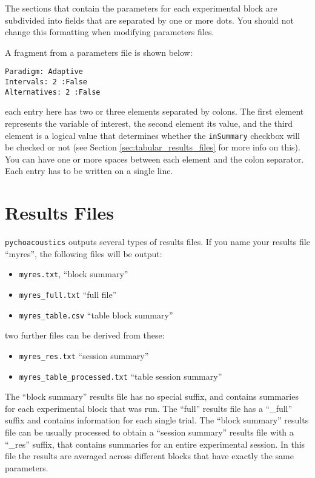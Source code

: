 The sections that contain the parameters for each experimental block are subdivided into fields that are separated by one or more dots. You should not change this formatting when modifying parameters files.

A fragment from a parameters file is shown below:
\begin{verbatim}
Paradigm: Adaptive
Intervals: 2 :False
Alternatives: 2 :False
\end{verbatim}
each entry here has two or three elements separated by colons. The first element represents the variable of interest, the second element its value, and the third element is a logical value that determines whether the \texttt{inSummary} checkbox will be checked or not (see Section \ref{sec:tabular_results_files} for more info on this). You can have one or more spaces between each element and the colon separator. Each entry has to be written on a single line.

\section{Results Files}
\label{sec:results_files}
\texttt{pychoacoustics} outputs several types of results files. If you name your results file ``myres'', the following files will be output:
\begin{itemize}
\item \verb+myres.txt+, ``block summary''
\item \verb+myres_full.txt+ ``full file''
\item \verb+myres_table.csv+ ``table block summary''
\end{itemize}
two further files can be derived from these:
\begin{itemize}
\item \verb+myres_res.txt+ ``session summary''
\item \verb+myres_table_processed.txt+ ``table session summary''
\end{itemize}
The ``block summary'' results file has no special suffix, and contains summaries for each experimental 
block that was run. The ``full'' results file has a ``\_full'' suffix and contains information 
for each single trial. The ``block summary'' results file can be usually processed to obtain 
a ``session summary'' results file with a ``\_res'' suffix, that contains summaries for an 
entire experimental session. In this file the results are averaged across different blocks 
that have exactly the same parameters. 


